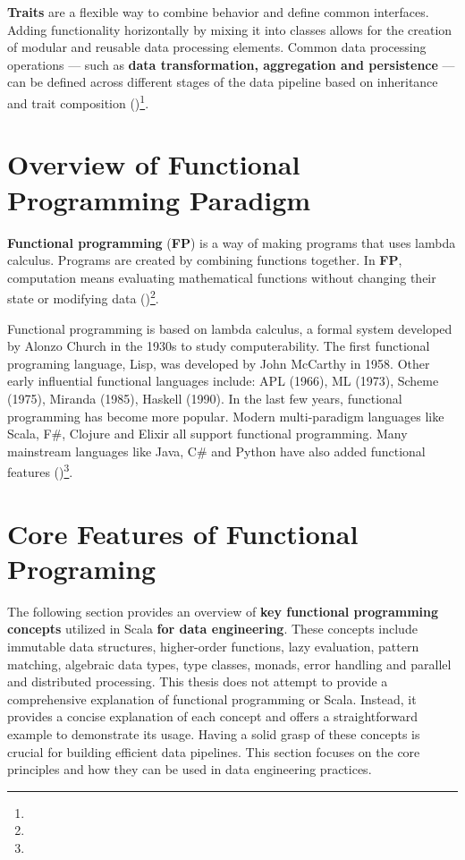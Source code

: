 \textbf{Traits} are a flexible way to combine behavior and define common interfaces. Adding functionality horizontally by mixing it into classes allows for the creation of modular and reusable data processing elements. Common data processing operations — such as \textbf{data transformation, aggregation and persistence} — can be defined across different stages of the data pipeline based on inheritance and trait composition (\cite{ghoshDSLsAction2011})\footnote[3]{}.



\section{Overview of Functional Programming Paradigm}

\textbf{Functional programming} (\textbf{FP}) is a way of making programs that uses lambda calculus. Programs are created by combining functions together. In \textbf{FP}, computation means evaluating mathematical functions without changing their state or modifying data (\cite{StenbergFunctionalAI})\footnote[5]{}.

Functional programming is based on lambda calculus, a formal system developed by Alonzo Church in the 1930s to study computerability. The first functional programing language, Lisp, was developed by John McCarthy in 1958. Other early influential functional languages include: APL (1966), ML (1973), Scheme (1975), Miranda (1985), Haskell (1990). In the last few years, functional programming has become more popular. Modern multi-paradigm languages like Scala, F\#, Clojure and Elixir all support functional programming. Many mainstream languages like Java, C\# and Python have also added functional features (\cite{Kunasaikaran2016ABO})\footnote[6]{}.

\section{Core Features of Functional Programing}

The following section provides an overview of \textbf{key functional programming concepts} utilized in Scala \textbf{for data engineering}. These concepts include immutable data structures, higher-order functions, lazy evaluation, pattern matching, algebraic data types, type classes, monads, error handling and parallel and distributed processing. This thesis does not attempt to provide a comprehensive explanation of functional programming or Scala. Instead, it provides a concise explanation of each concept and offers a straightforward example to demonstrate its usage. Having a solid grasp of these concepts is crucial for building efficient data pipelines. This section focuses on the core principles and how they can be used in data engineering practices.

